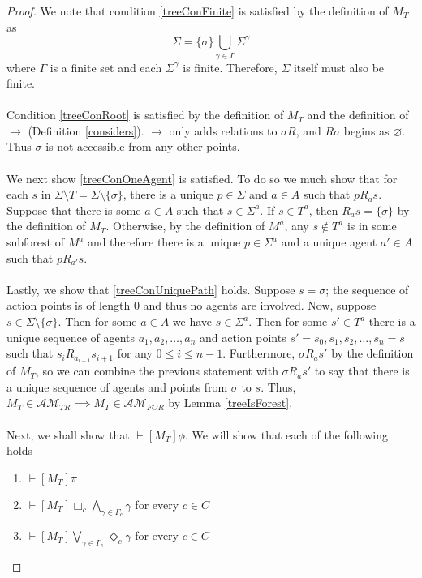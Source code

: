 \documentclass[12pt, a4paper, titlepage]{scrartcl}
\numberwithin{equation}{section}
\newcommand{\sqex}[1]{[{#1}]}
\newcommand{\eventClass}{\mathcal{AM}}
\newcommand{\treeClass}{\eventClass_{TR}}
\newcommand{\forestClass}{\eventClass_{FOR}}
\begin{document}
\begin{proof}
We note that condition \ref{treeConFinite} is satisfied by the definition of $M_T$ as
\[\Sigma = \{\sigma\} \bigcup_{\gamma \in \Gamma} \Sigma^{\gamma}\]
where $\Gamma$ is a finite set and each $\Sigma^\gamma$ is finite.
Therefore, $\Sigma$ itself must also be finite.\\
\\
Condition \ref{treeConRoot} is satisfied by the definition of $M_T$ and the definition of $\to$
(Definition \ref{considers}).
$\to$ only adds relations to $\sigma R$, and $R \sigma$ begins as $\varnothing$.
Thus $\sigma$ is not accessible from any other points.\\
\\
We next show \ref{treeConOneAgent} is satisfied.
To do so we much show that for each $s$ in $\Sigma \setminus T = \Sigma \setminus \{ \sigma \}$, there
is a unique $p \in \Sigma$ and $a \in A$ such that $p R_a s$.
Suppose that there is some $a \in A$ such that $s \in \Sigma^a$.
If $s \in T^a$, then $R_a s = \{ \sigma \}$ by the definition of $M_T$.
Otherwise, by the definition of $M^a$, any $s \notin T^a$ is in some subforest of $M^a$
and therefore there is a unique $p \in \Sigma^a$ and a unique agent $a' \in A$ such that $p R_{a'}
s$.\\
\\
Lastly, we show that \ref{treeConUniquePath} holds.
Suppose $s = \sigma$; the sequence of action points is of length 0 and thus no agents are involved.
Now, suppose $s \in \Sigma \setminus \{ \sigma \}$.
Then for some $a \in A$ we have $s \in \Sigma^a$.
Then for some $s' \in T^a$ there is a unique sequence of agents $a_1, a_2, \ldots, a_n$ and action
points $s' = s_0, s_1, s_2, \ldots, s_n = s$ such that $s_i R_{a_{i+1}} s_{i+1}$ for any $0 \leq i
\leq n-1$.
Furthermore, $\sigma R_a s'$ by the definition of $M_T$, so we can combine the previous statement
with $\sigma R_a s'$ to say that there is a unique sequence of agents and points from $\sigma$ to
$s$.
Thus, $M_T \in \treeClass \implies M_T \in \forestClass$ by Lemma \ref{treeIsForest}.\\
\\
Next, we shall show that $\vdash \sqex{M_T} \phi$.
We will show that each of the following holds
\begin{enumerate}
	\item $\vdash \sqex{M_T} \pi$
	\item $\vdash \sqex{M_T} \Box_c \bigwedge_{\gamma \in \Gamma_c} \gamma$ for every $c \in C$
	\item $\vdash \sqex{M_T} \bigvee_{\gamma \in \Gamma_c} \Diamond_c \gamma$ for every $c \in C$
\end{enumerate}


\end{proof}
\end{document}
